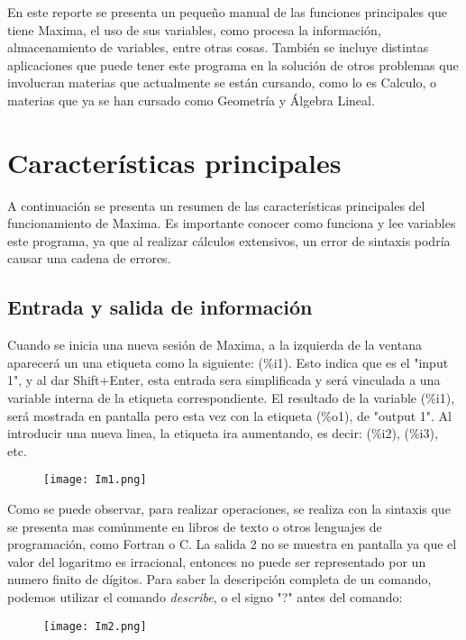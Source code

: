 \documentclass[12pt]{article}
\begin{document}
En este reporte se presenta un pequeño manual de las funciones principales que tiene Maxima, el uso de sus variables, como procesa la información, almacenamiento de variables, entre otras cosas. También se incluye distintas aplicaciones que puede tener este programa en la solución de otros problemas que involucran materias que actualmente se están cursando, como lo es Calculo, o materias que ya se han cursado como Geometría y Álgebra Lineal. 

\section{Características principales}
A continuación se presenta un resumen de las características principales del funcionamiento de Maxima. Es importante conocer como funciona y lee variables este programa, ya que al realizar cálculos extensivos, un error de sintaxis podría causar una cadena de errores.

\subsection{Entrada y salida de información}
Cuando se inicia una nueva sesión de Maxima, a la izquierda de la ventana aparecerá un una etiqueta como la siguiente: (\%i1). Esto indica que es el "input 1", y al dar Shift+Enter, esta entrada sera simplificada y será vinculada a una variable interna de la etiqueta correspondiente. El resultado de la variable (\%i1), será mostrada en pantalla pero esta vez con la etiqueta (\%o1), de "output 1". Al introducir una nueva linea, la etiqueta ira aumentando, es decir: (\%i2), (\%i3), etc. 

\begin{figure}[h!]
    \centering
\texttt{[image: Im1.png]}
\end{figure}

Como se puede observar, para realizar operaciones, se realiza con la sintaxis que se presenta mas comúnmente en libros de texto o otros lenguajes de programación, como Fortran o C. La salida 2 no se muestra en pantalla ya que el valor del logaritmo es irracional, entonces no puede ser representado por un numero finito de dígitos. Para saber la descripción completa de un comando, podemos utilizar el comando \textit{describe}, o el signo "?" antes del comando:

\begin{figure}[h!]
    \centering
\texttt{[image: Im2.png]}
\end{figure}
\end{document}
